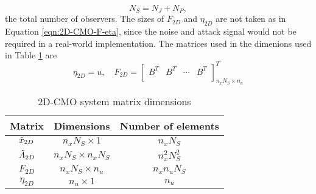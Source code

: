 \begin{equation*}
    N_S = N_J + N_P,
\end{equation*}
the total number of observers. The sizes of $F_{2D}$ and $\eta_{2D}$ are not taken as in Equation \eqref{eqn:2D-CMO-F-eta}, since the noise and attack signal would not be required in a real-world implementation. The matrices used in the dimenions used in Table \ref{tab:2D-CMO-dimensions} are
\begin{equation*}
    \eta_{2D} = u, \quad 
    F_{2D} = 
    \begin{bmatrix}
        B^{T} & B^{T} & \cdots & B^{T} \\
    \end{bmatrix}^{T}_{n_xN_S \times n_u}
\end{equation*}

\begin{table}[H]
    \centering
    \begin{tabular}{|c|c|c|}
       \toprule
       Matrix  & Dimensions & Number of elements \\ \midrule
       $\Tilde{x}_{2D}$  & $n_xN_S \times 1$ & $n_xN_S$ \\
       $\Tilde{A}_{2D}$ & $n_xN_S \times n_xN_S$ & $n_x^2N_S^2$ \\
       $F_{2D}$ & $n_xN_S \times n_u$ & $n_xn_uN_S$ \\
       $\eta_{2D}$ & $n_u \times 1$ & $n_u$ \\
       \bottomrule
    \end{tabular}
    \caption{2D-CMO system matrix dimensions}
    \label{tab:2D-CMO-dimensions}
\end{table}

